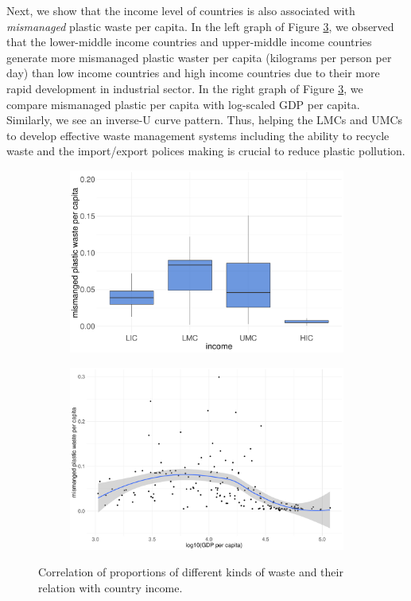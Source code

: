 \documentclass[dvipsnames]{article}
\begin{document}
Next, we show that the income level of countries is also associated with \textit{mismanaged} plastic waste per capita. In the left graph of Figure \ref{fig:mismanged}, we observed that the lower-middle income countries and upper-middle income countries generate more mismanaged plastic waster per capita (kilograms per person per day) than low income countries and high income countries due to their more rapid development in industrial sector. In the right graph of Figure \ref{fig:mismanged}, we compare mismanaged plastic per capita with log-scaled GDP per capita. Similarly, we see an inverse-U curve pattern. Thus, helping the LMCs and UMCs to develop effective waste management systems including the ability to recycle waste and the import/export polices making is crucial to reduce plastic pollution.

\begin{figure}[htb!]
	\centering
	\begin{subfigure}{0.46\textwidth}
		\centering
		\includegraphics[width=\textwidth]{figures/boxplot_mis_per_person.pdf}	
		\label{subfig:boxplot_mis}
	\end{subfigure}
	\begin{subfigure}{0.46\textwidth}
		\centering 
		\includegraphics[width=\textwidth]{figures/scatter_mis_per_person.pdf}
		\label{subfig:scatter_mis}
	\end{subfigure}
	\caption{\small Correlation of proportions of different kinds of waste and their relation with country income.}
	\label{fig:mismanged}
\end{figure}
\end{document}
